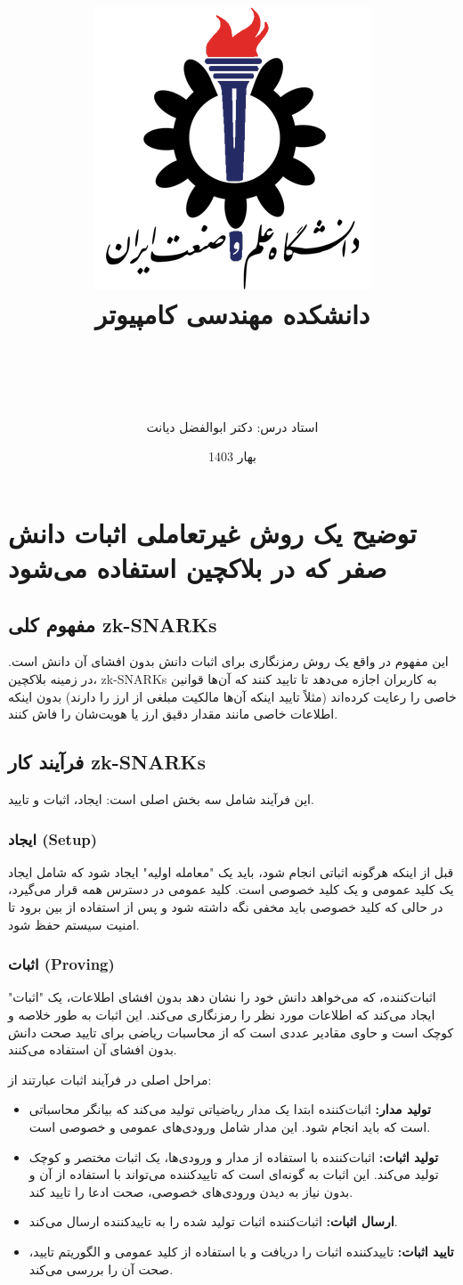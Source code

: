\documentclass[11pt]{article}
\title{
    \includegraphics[width=0.5\linewidth]{images/IUST_logo_color.png} \\
    دانشکده مهندسی کامپیوتر \\
}
\author{
    \Course \\ \vspace{0.5cm}
    \Subject \\ \vspace{0.5cm}
    \Author \\ \vspace{0.5cm}
    \StudentNumber \\ \vspace{0.5cm}
    استاد درس: دکتر ابوالفضل دیانت
}
\date{بهار 1403}
\begin{document}
    
    \maketitle
    \newpage
    \section*{توضیح یک روش غیرتعاملی اثبات دانش صفر که در بلاکچین استفاده می‌شود}

    \subsection*{مفهوم کلی zk-SNARKs}
    این مفهوم در واقع یک روش رمزنگاری برای اثبات دانش بدون افشای آن دانش است. در زمینه بلاکچین، zk-SNARKs به کاربران اجازه می‌دهد تا تایید کنند که آن‌ها قوانین خاصی را رعایت کرده‌اند (مثلاً تایید اینکه آن‌ها مالکیت مبلغی از ارز را دارند) بدون اینکه اطلاعات خاصی مانند مقدار دقیق ارز یا هویت‌شان را فاش کنند.

    \subsection*{فرآیند کار zk-SNARKs}
    این فرآیند شامل سه بخش اصلی است: ایجاد، اثبات و تایید.

    \subsubsection*{ایجاد (Setup)}
    قبل از اینکه هرگونه اثباتی انجام شود، باید یک "معامله اولیه" ایجاد شود که شامل ایجاد یک کلید عمومی و یک کلید خصوصی است. کلید عمومی در دسترس همه قرار می‌گیرد، در حالی که کلید خصوصی باید مخفی نگه داشته شود و پس از استفاده از بین برود تا امنیت سیستم حفظ شود.

    \subsubsection*{اثبات (Proving)}
    اثبات‌کننده، که می‌خواهد دانش خود را نشان دهد بدون افشای اطلاعات، یک "اثبات" ایجاد می‌کند که اطلاعات مورد نظر را رمزنگاری می‌کند. این اثبات به طور خلاصه و کوچک است و حاوی مقادیر عددی است که از محاسبات ریاضی برای تایید صحت دانش بدون افشای آن استفاده می‌کنند.
    
    مراحل اصلی در فرآیند اثبات عبارتند از:
    \begin{itemize}
        \item \textbf{تولید مدار:} اثبات‌کننده ابتدا یک مدار ریاضیاتی تولید می‌کند که بیانگر محاسباتی است که باید انجام شود. این مدار شامل ورودی‌های عمومی و خصوصی است.
        \item \textbf{تولید اثبات:} اثبات‌کننده با استفاده از مدار و ورودی‌ها، یک اثبات مختصر و کوچک تولید می‌کند. این اثبات به گونه‌ای است که تاییدکننده می‌تواند با استفاده از آن و بدون نیاز به دیدن ورودی‌های خصوصی، صحت ادعا را تایید کند.
        \item \textbf{ارسال اثبات:} اثبات‌کننده اثبات تولید شده را به تاییدکننده ارسال می‌کند.
        \item \textbf{تایید اثبات:} تاییدکننده اثبات را دریافت و با استفاده از کلید عمومی و الگوریتم تایید، صحت آن را بررسی می‌کند.
    \end{itemize}
\end{document}
